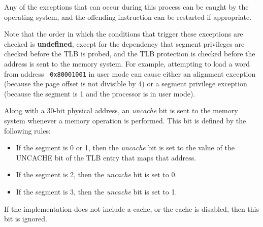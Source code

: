 Any of the exceptions that can occur during this process can be caught
by the operating system, and the offending instruction can be
restarted if appropriate.

Note that the order in which the conditions that trigger these
exceptions are checked is {\bf undefined}, except for the dependency
that segment privileges are checked before the TLB is probed, and the
TLB protection is checked before the address is sent to the memory
system.  For example, attempting to load a word from address {\tt
0x80001001} in user mode can cause either an alignment exception
(because the page offset is not divisible by 4) or a segment privilege
exception (because the segment is 1 and the processor is in user
mode).

Along with a 30-bit physical address, an {\em uncache} bit is sent to
the memory system whenever a memory operation is performed.  This bit
is defined by the following rules:

\begin{itemize}

\item If the segment is 0 or 1, then the {\em uncache} bit is set to
	the value of the {\sc UNCACHE} bit of the TLB entry that maps
	that address.

\item If the segment is 2, then the {\em uncache} bit is set to 0.

\item If the segment is 3, then the {\em uncache} bit is set to 1.

\end{itemize}

If the implementation does not include a cache, or the cache
is disabled, then this bit is ignored.


